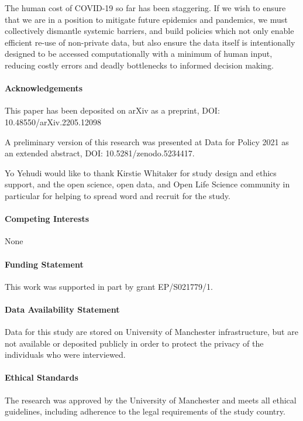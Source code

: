 \documentclass{CUP-JNL-DAP}%
\begin{document}
The human cost of COVID-19 so far has been staggering. If we wish to ensure that we are in a position to mitigate future epidemics and pandemics, we must collectively dismantle systemic barriers, and build policies which not only enable efficient re-use of non-private data, but also ensure the data itself is intentionally designed to be accessed computationally with a minimum of human input, reducing costly errors and deadly bottlenecks to informed decision making. 

\begin{Backmatter}

\paragraph{Acknowledgements}
This paper has been deposited on arXiv as a preprint, DOI: 10.48550/arXiv.2205.12098

A preliminary version of this research was presented at Data for Policy 2021 as an extended abstract, DOI: 10.5281/zenodo.5234417. 

Yo Yehudi would like to thank Kirstie Whitaker for study design and ethics support, and the open science, open data, and Open Life Science community in particular for helping to spread word and recruit for the study.

\paragraph{Competing Interests}
None

\paragraph{Funding Statement}
This work was supported in part by grant EP/S021779/1.

\paragraph{Data Availability Statement}
Data for this study are stored on University of Manchester infrastructure, but are not available or deposited publicly in order to protect the privacy of the individuals who were interviewed.

\paragraph{Ethical Standards}
The research was approved by the University of Manchester and meets all ethical guidelines, including adherence to the legal requirements of the study country.


\end{Backmatter}
\end{document}
